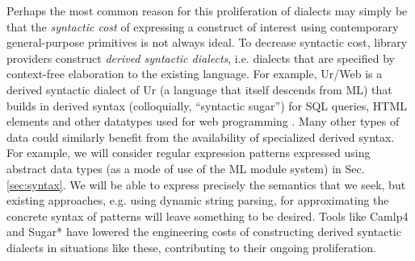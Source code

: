 Perhaps the most common reason for this proliferation of dialects may simply be that the \emph{syntactic cost} of expressing a construct of interest using contemporary general-purpose primitives is not always ideal. To decrease syntactic cost, library providers construct \emph{derived syntactic dialects}, i.e. dialects that are specified by context-free elaboration to the existing language. For example, Ur/Web is a  derived syntactic dialect of Ur (a language that itself descends from ML) that builds in derived syntax (colloquially, ``syntactic sugar'') for SQL queries, HTML elements and other datatypes used for web programming \cite{conf/popl/Chlipala15}. %
Many other types of data could similarly benefit from the availability of specialized derived syntax. For example, we will consider regular expression patterns expressed using abstract data types (as a mode of use of the ML module system) in Sec. \ref{sec:syntax}. We will be able to express precisely the semantics that we seek, but existing approaches, e.g. using dynamic string parsing, for approximating the concrete syntax of patterns will leave something to be desired. 
Tools like Camlp4 \cite{ocaml-manual} and Sugar* \cite{erdweg2011sugarj,erdweg2013framework} have lowered the engineering costs of constructing derived syntactic dialects in situations like these, contributing to their ongoing proliferation. %


